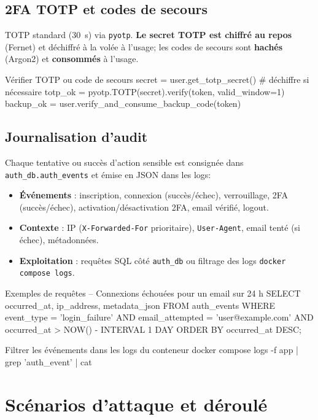 \subsection*{2FA TOTP et codes de secours}
\noindent TOTP standard (30~s) via \texttt{pyotp}. \textbf{Le secret TOTP est chiffré au repos} (Fernet) et déchiffré à la volée à l'usage; les codes de secours sont \textbf{hachés} (Argon2) et \textbf{consommés} à l'usage.
\begin{codebox}[language=Python]{Vérifier TOTP ou code de secours}
secret = user.get_totp_secret()  # déchiffre si nécessaire
totp_ok = pyotp.TOTP(secret).verify(token, valid_window=1)
backup_ok = user.verify_and_consume_backup_code(token)
\end{codebox}

\subsection*{Journalisation d'audit}
\noindent Chaque tentative ou succès d'action sensible est consignée dans \texttt{auth\_db.auth\_events} et émise en JSON dans les logs:\
\begin{itemize}
  \item \textbf{Événements} : inscription, connexion (succès/échec), verrouillage, 2FA (succès/échec), activation/désactivation 2FA, email vérifié, logout.
  \item \textbf{Contexte} : IP (\texttt{X-Forwarded-For} prioritaire), \texttt{User-Agent}, email tenté (si échec), métadonnées.
  \item \textbf{Exploitation} : requêtes SQL côté \texttt{auth\_db} ou filtrage des logs \texttt{docker compose logs}.
\end{itemize}

\begin{codebox}[language=SQL]{Exemples de requêtes}
-- Connexions échouées pour un email sur 24 h
SELECT occurred_at, ip_address, metadata_json
FROM auth_events
WHERE event_type = 'login_failure'
  AND email_attempted = 'user@example.com'
  AND occurred_at > NOW() - INTERVAL 1 DAY
ORDER BY occurred_at DESC;
\end{codebox}

\begin{codebox}[language=bash]{Filtrer les événements dans les logs du conteneur}
docker compose logs -f app | grep 'auth_event' | cat
\end{codebox}

\section{Scénarios d'attaque et déroulé}

